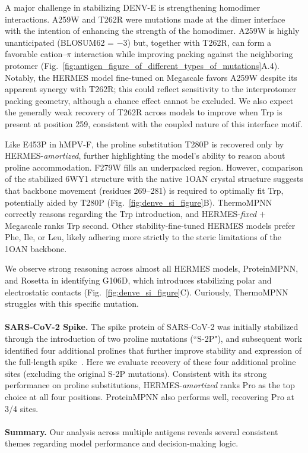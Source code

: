 A major challenge in stabilizing DENV-E is strengthening homodimer interactions. A259W and T262R
were mutations made at the dimer interface with the intention of enhancing the strength of the
homodimer. A259W is highly unanticipated (BLOSUM62 = $-3$) but, together with T262R, can form a
favorable cation--$\pi$ interaction while improving packing against the neighboring protomer
(Fig.~\ref{fig:antigen_figure_of_different_types_of_mutations}A.4). Notably, the HERMES model
fine-tuned on Megascale favors A259W despite its apparent synergy with T262R; this could reflect
sensitivity to the interprotomer packing geometry, although a chance effect cannot be excluded. We
also expect the generally weak recovery of T262R across models to improve when Trp is present at
position 259, consistent with the coupled nature of this interface motif.



Like E453P in hMPV-F, the proline substitution T280P is recovered only by HERMES-\textit{amortized},
further highlighting the model's ability to reason about proline accommodation. F279W fills an
underpacked region. However, comparison of the stabilized 6WY1 structure with the native 1OAN
crystal structure suggests that backbone movement (residues 269--281) is required to optimally fit
Trp, potentially aided by T280P (Fig.~\ref{fig:denve_si_figure}B). ThermoMPNN correctly reasons
regarding the Trp introduction, and HERMES-\textit{fixed} $+$ Megascale ranks Trp second. Other
stability-fine-tuned HERMES models prefer Phe, Ile, or Leu, likely adhering more strictly to the
steric limitations of the 1OAN backbone.

We observe strong reasoning across almost all HERMES models, ProteinMPNN, and Rosetta in identifying
G106D, which introduces stabilizing polar and electrostatic contacts
(Fig.~\ref{fig:denve_si_figure}C). Curiously, ThermoMPNN struggles with this specific mutation.\\
\\
\textbf{SARS-CoV-2 Spike.} 
The spike protein of SARS-CoV-2 was initially stabilized through the introduction of two proline
mutations (``S-2P"), and subsequent work identified four additional prolines that further improve
stability and expression of the full-length spike~\citep{hsieh_structure-based_2020}. Here we
evaluate recovery of these four additional proline sites (excluding the original S-2P mutations).
Consistent with its strong performance on proline substitutions, HERMES-\textit{amortized} ranks Pro
as the top choice at all four positions. ProteinMPNN also performs well, recovering Pro at 3/4
sites. \\\\
\textbf{Summary.} 
Our analysis across multiple antigens reveals several consistent themes regarding model performance
and decision-making logic.

